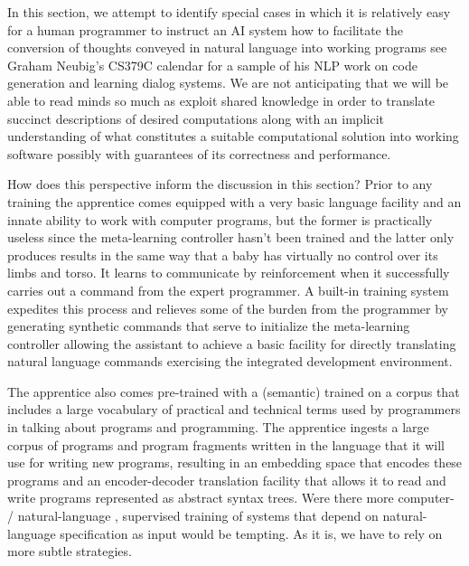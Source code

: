 In this section, we attempt to identify special cases in which it is relatively easy for a human programmer to instruct an AI system how to facilitate the conversion of thoughts conveyed in natural language into working programs \emdash{} see Graham Neubig's CS379C calendar {} for a sample of his NLP work on code generation and learning dialog systems. We are not anticipating that we will be able to read minds so much as exploit shared knowledge in order to translate succinct descriptions of desired computations \emdash{} along with an implicit understanding of what constitutes a suitable computational solution \emdash{} into working software possibly with guarantees of its correctness and performance.

How does this perspective inform the discussion in this section? Prior to any training the apprentice comes equipped with a very basic language facility and an innate ability to work with computer programs, but the former is practically useless since the meta-learning controller hasn't been trained and the latter only produces results in the same way that a baby has virtually no control over its limbs and torso. It learns to communicate by reinforcement when it successfully carries out a command from the expert programmer. A built-in training system expedites this process and relieves some of the burden from the programmer by generating synthetic commands that serve to initialize the meta-learning controller allowing the assistant to achieve a basic facility for directly translating natural language commands exercising the integrated development environment.

The apprentice also comes pre-trained with a (semantic) {} trained on a corpus that includes a large vocabulary of practical and technical terms used by programmers in talking about programs and programming. The apprentice ingests a large corpus of programs and program fragments written in the language that it will use for writing new programs, resulting in an embedding space that encodes these programs and an encoder-decoder translation facility that allows it to read and write programs represented as abstract syntax trees. Were there more computer- / natural-language {}, supervised training of systems that depend on natural-language specification as input would be tempting. As it is, we have to rely on more subtle strategies.

